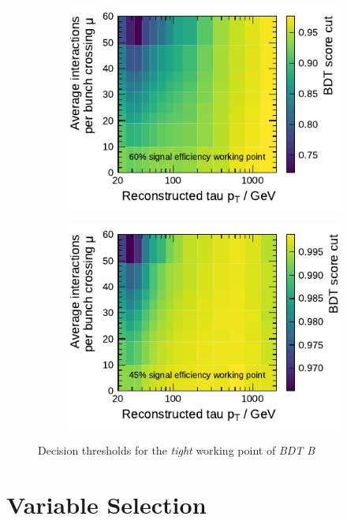 \begin{figure}[htb]
  \begin{subfigure}[t]{0.48\textwidth}
    \centering
    \includegraphics{./figures/bdt_perf/working_points/grid_1p_subsampling0269_wp.pdf}
  \end{subfigure}\hfill
  \begin{subfigure}[t]{0.48\textwidth}
    \centering
    \includegraphics{./figures/bdt_perf/working_points/grid_3p0327_wp.pdf}
  \end{subfigure}
  \caption{Decision thresholds for the \emph{tight} working point of \emph{BDT
      B}}
  \label{fig:working_point_cutmap}
\end{figure}


\section{Variable Selection}
\label{sec:bdt_variable_selection}

